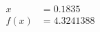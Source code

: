 \documentclass[preview]{standalone}
\begin{document}
\begin{align*}
x &= 0.1835\\f(x) &= 4.3241388
\end{align*}
\end{document}
